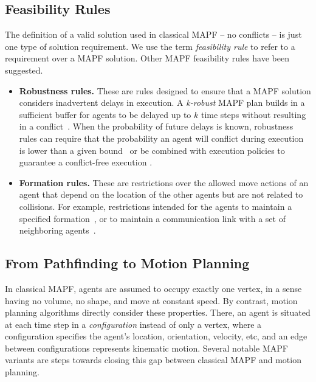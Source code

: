 \documentclass[letterpaper]{article} %
\newcommand{\mapf}{\ac{MAPF}\xspace}
\begin{document}
\subsection{Feasibility Rules}
The definition of a valid solution used in classical MAPF -- no conflicts -- is just one
type of solution requirement.
We use the term \emph{feasibility rule} to refer to a requirement over a \mapf solution. Other \mapf feasibility rules have been suggested.
\begin{itemize}
\item \textbf{Robustness rules.} These are rules designed to ensure that a \mapf solution considers inadvertent delays in execution. A \emph{k-robust} MAPF plan builds in a sufficient buffer for agents to be delayed up to $k$ time steps without resulting in a conflict~\cite{atzmon2018robust}.
When the probability of future delays is known, robustness rules can require that the probability an agent will conflict during execution is lower than a given bound~\cite{wagner2017path} or be combined with execution policies to guarantee a conflict-free execution \cite{MaAAAI17}.
\item \textbf{Formation rules.} These are restrictions over the allowed move actions of an agent that depend on the location of the other agents but are not related to collisions. For example, restrictions intended for the agents to maintain a specified formation~\cite{barel2017come}, or to maintain a communication link with a set of neighboring agents~\cite{stump2011visibility,gilboa2006distributed}.
\end{itemize}
\subsection{From Pathfinding to Motion Planning}
In classical MAPF, agents are assumed to occupy exactly one vertex, in a sense having no volume, no shape, and move at constant speed. By contrast, motion planning algorithms directly consider these  properties. There, an agent is situated at each time step in a \emph{configuration} instead of only a vertex, where a configuration specifies the agent's location, orientation, velocity, etc, and an edge between configurations represents kinematic motion. Several notable \mapf variants are steps towards closing this gap between classical \mapf and motion planning. %
\end{document}
